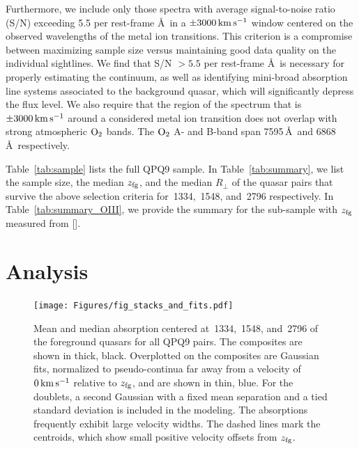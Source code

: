\documentclass[iop]{emulateapj}
\begin{document}
Furthermore, we include only those spectra with average signal-to-noise ratio (S/N) exceeding 5.5 
per rest-frame \AA \ in a $\pm3000\,{\rm km\,s^{-1}}$ window centered on the observed wavelengths 
of the metal ion transitions. This criterion is a compromise between maximizing sample size versus 
maintaining good data quality on the individual sightlines. We find that S/N $>5.5$ per rest-frame 
\AA \ is 
necessary for properly estimating the continuum, as well as identifying mini-broad absorption line 
systems associated to the background quasar, which will significantly depress the flux level. We 
also require that the region of the spectrum that is $\pm3000\,{\rm km\,s^{-1}}$ around a 
considered metal ion transition does not overlap with strong atmospheric ${\rm O}_2$ bands. 
The ${\rm O}_2$ A- and B-band span 7595\,\AA \ and 6868\,\AA \ 
respectively. 

Table~\ref{tab:sample} lists the full QPQ9 sample. 
In Table~\ref{tab:summary}, we list the sample size, the median $z_{\rm fg}$, and the median 
$R_\perp$ of the quasar pairs that survive the above selection criteria for \ion{C}{2}\,1334, 
\ion{C}{4}\,1548, and \ion{Mg}{2}\,2796 respectively. In Table~\ref{tab:summary_OIII}, we provide 
the summary for the sub-sample with $z_{\rm fg}$ measured from [\ion{O}{3}]. 





\section{Analysis}
\label{sec:analysis}

\begin{figure}
\texttt{[image: Figures/fig\_stacks\_and\_fits.pdf]}
\caption{Mean and median absorption centered at \,1334, \,1548, and 
\ion{Mg}{2}\,2796 of the foreground quasars for all QPQ9 pairs. The composites are shown in thick, 
black. Overplotted on the composites are Gaussian fits, normalized to pseudo-continua far away 
from a velocity of $0\,{\rm km\,s^{-1}}$ relative to $z_{\rm fg}$, and are shown in thin, blue. 
For the doublets, a second Gaussian with a fixed mean separation and a tied standard deviation is 
included in the modeling. The absorptions frequently exhibit large velocity widths. The dashed 
lines mark the centroids, which show small positive velocity offsets from $z_{\rm fg}$.  
}
\label{fig:stacks_and_fits}
\end{figure}
\end{document}
